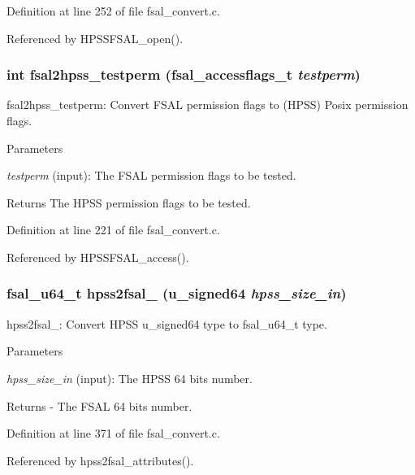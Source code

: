 Definition at line 252 of file fsal\_\-convert.c.

Referenced by HPSSFSAL\_\-open().
\subsubsection[{fsal2hpss\_\-testperm}]{\setlength{\rightskip}{0pt plus 5cm}int fsal2hpss\_\-testperm (fsal\_\-accessflags\_\-t {\em testperm})}\label{fsal__convert_8c_aa85a0a90dbf019ac770cbdc2c4b59ca2}
fsal2hpss\_\-testperm: Convert FSAL permission flags to (HPSS) Posix permission flags.


\begin{DoxyParams}{Parameters}
\item[{\em testperm}](input): The FSAL permission flags to be tested.\end{DoxyParams}
\begin{DoxyReturn}{Returns}
The HPSS permission flags to be tested. 
\end{DoxyReturn}


Definition at line 221 of file fsal\_\-convert.c.

Referenced by HPSSFSAL\_\-access().
\subsubsection[{hpss2fsal\_\-64}]{\setlength{\rightskip}{0pt plus 5cm}fsal\_\-u64\_\-t hpss2fsal\_ (u\_\-signed64 {\em hpss\_\-size\_\-in})}\label{fsal__convert_8c_a1720b0c9b09fd3abc1b5384937d9c7f1}
hpss2fsal\_: Convert HPSS u\_\-signed64 type to fsal\_\-u64\_\-t type.


\begin{DoxyParams}{Parameters}
\item[{\em hpss\_\-size\_\-in}](input): The HPSS 64 bits number.\end{DoxyParams}
\begin{DoxyReturn}{Returns}
-\/ The FSAL 64 bits number. 
\end{DoxyReturn}


Definition at line 371 of file fsal\_\-convert.c.

Referenced by hpss2fsal\_\-attributes().
